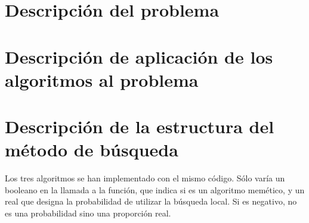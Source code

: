\documentclass[a4paper, 11pt]{article}
\begin{document}
  \maketitle
  \tableofcontents
  \newpage

  \section{Descripción del problema}

    

  \section{Descripción de aplicación de los algoritmos al problema}
    
  \section{Descripción de la estructura del método de búsqueda}
    Los tres algoritmos se han implementado con el mismo código. Sólo varía un
    booleano en la llamada a la función, que indica si es un algoritmo memético,
    y un real que designa la probabilidad de utilizar la búsqueda local. Si
    es negativo, no es una probabilidad sino una proporción real.
\end{document}
